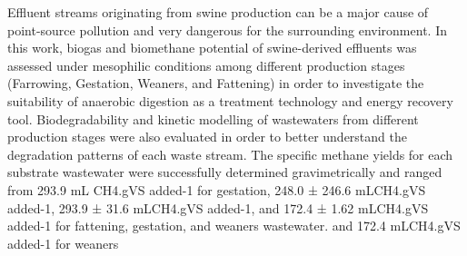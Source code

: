 Effluent streams originating from swine production can be a major cause of point-source pollution and very dangerous for the surrounding environment. In this work, biogas and biomethane potential of swine-derived effluents was assessed under mesophilic conditions among different production stages (Farrowing, Gestation, Weaners, and Fattening) in order to investigate the suitability of anaerobic digestion as a treatment technology and energy recovery tool. Biodegradability and kinetic modelling of wastewaters from different production stages were also evaluated in order to better understand the degradation patterns of each waste stream. The specific methane yields for each substrate wastewater were successfully determined gravimetrically and ranged from 293.9 mL CH4.gVS added-1 for gestation, 248.0 ± 246.6 mLCH4.gVS added-1, 293.9 ± 31.6 mLCH4.gVS added-1, and 172.4 ± 1.62 mLCH4.gVS added-1 for fattening, gestation, and weaners wastewater. and 172.4 mLCH4.gVS added-1 for weaners